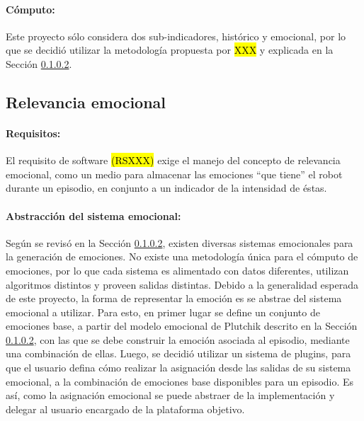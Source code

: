 \paragraph{Cómputo:}
Este proyecto sólo considera dos sub-indicadores, histórico y emocional, por lo que se decidió utilizar la metodología propuesta por \hl{XXX} \cite{} y explicada en la Sección \ref{}.



\subsection{Relevancia emocional}

\paragraph{Requisitos:}
El requisito de software \hl{(RSXXX)} exige el manejo del concepto de relevancia emocional, como un medio para almacenar las emociones ``que tiene'' el robot durante un episodio, en conjunto a un indicador de la intensidad de éstas.


\paragraph{Abstracción del sistema emocional:}
Según se revisó en la Sección \ref{}, existen diversas sistemas emocionales para la generación de emociones. No existe una metodología única para el cómputo de emociones, por lo que cada sistema es alimentado con datos diferentes, utilizan algoritmos distintos y proveen salidas distintas. Debido a la generalidad esperada de este proyecto, la forma de representar la emoción es se abstrae del sistema emocional a utilizar. Para esto, en primer lugar se define un conjunto de emociones base, a partir del modelo emocional de Plutchik descrito en la Sección \ref{}, con las que se debe construir la emoción asociada al episodio, mediante una combinación de ellas. Luego, se decidió utilizar un sistema de plugins, para que el usuario defina cómo realizar la asignación desde las salidas de su sistema emocional, a la combinación de emociones base disponibles para un episodio. Es así, como la asignación emocional se puede  abstraer de la implementación y delegar al usuario encargado de la plataforma objetivo.


